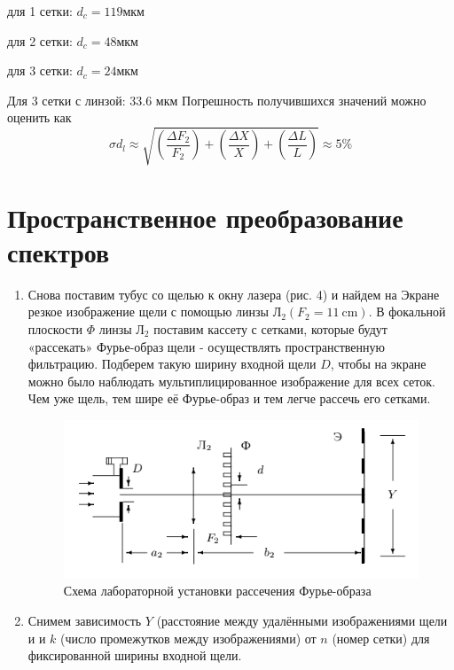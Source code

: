 \documentclass[a4paper, 12pt]{article}
\begin{document}
\par
для 1 сетки: $d_c = 119$мкм

для 2 сетки: $d_c = 48$мкм

для 3 сетки: $d_c = 24$мкм

Для 3 сетки с линзой: 33.6 мкм
Погрешность получившихся значений можно оценить как 
$$\sigma d_l \approx \sqrt{\left(\frac{\Delta F_2}{F_2}\right) + \left(\frac{\Delta X}{X}\right) + \left(\frac{\Delta L}{L}\right)} \approx 5\%$$

\section*{Пространственное преобразование спектров}

\begin{enumerate}
    \item Снова поставим тубус со щелью к окну лазера (рис. 4) и найдем на Экране резкое изображение щели с помощью линзы Л$_{2}\left(F_{2} = 11 \mathrm{~cm}\right) .$ В фокальной плоскости $\Phi$ линзы Л$_{2}$ поставим кассету с сетками, которые будут «рассекать» Фурье-образ щели - осуществлять пространственную фильтрацию. Подберем такую ширину входной щели $D$, чтобы на экране можно было наблюдать мультиплицированное изображение для всех сеток. Чем уже щель, тем шире её Фурье-образ и тем легче рассечь его сетками.
    
    \begin{figure}[h]
        \centering
        \includegraphics[width=15cm]{scheme_IV.png}
        \caption{Схема лабораторной установки рассечения Фурье-образа}
        \label{fig:scheme_IV}
    \end{figure}
    
    \newpage
    
    \item Снимем зависимость $Y$ (расстояние между удалёнными изображениями щели и и $k$ (число промежутков между изображениями) от $n$ (номер сетки) для фиксированной ширины входной щели.


\end{enumerate}
\end{document}
